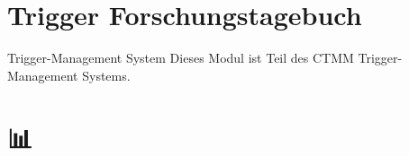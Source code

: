 
\section{Trigger Forschungstagebuch}
\label{sec:trigger-forschungstagebuch}


\begin{ctmmGreenBox}{Trigger-Management System}
Dieses Modul ist Teil des CTMM Trigger-Management Systems.
\end{ctmmGreenBox}

\hypertarget{trigger-forschungstagebuch}{%
\section[ 📊 \ul{\textbf{\textcolor{ctmmBlue}{\1}}}]{\texorpdfstring{\protect\hypertarget{X3e59fc2da0fba2c843fe38ff4121a907867d760}{}{} 📊 \ul{\textbf{\textcolor{ctmmBlue}{\1}}}}{ 📊 TRIGGER-FORSCHUNGSTAGEBUCH}}\label{trigger-forschungstagebuch}}

\hfill\break
\hfill\break

🧩 \textbf{\textcolor{ctmmBlue}{\1}}

\hfill\break
\hfill\break

\hypertarget{tuxe4gliches-trigger-tracking}{%
\subsection[📆 \ul{\textbf{\textcolor{ctmmBlue}{\1}}}]{\texorpdfstring{\protect\hypertarget{tuxe4gliches-trigger-tracking}{}{}📆 \ul{\textbf{\textcolor{ctmmBlue}{\1}}}}{📆 TÄGLICHES TRIGGER-TRACKING}}\label{tuxe4gliches-trigger-tracking}}

